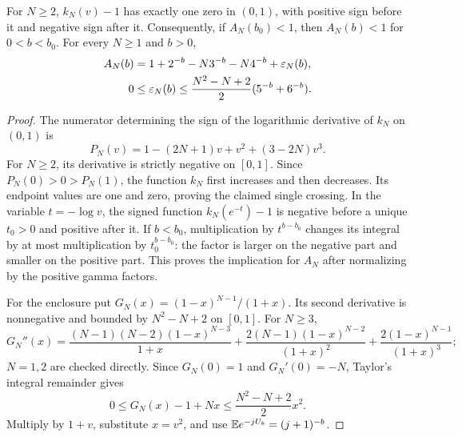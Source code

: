 \begin{lemma}\label{ord:lem:axis}
For $N\ge2$, $k_N(v)-1$ has exactly one zero in $(0,1)$, with positive
sign before it and negative sign after it. Consequently, if
$A_N(b_0)<1$, then $A_N(b)<1$ for $0<b<b_0$.
For every $N\ge1$ and $b>0$,
\begin{equation}\label{ord:eq:axis-taylor}
 \begin{split}
 A_N(b)&=1+2^{-b}-N3^{-b}-N4^{-b}+\varepsilon_N(b),\\
 0&\le\varepsilon_N(b)\le\frac{N^2-N+2}{2}(5^{-b}+6^{-b}).
 \end{split}
\end{equation}
\end{lemma}
\begin{proof}
The numerator determining the sign of the logarithmic derivative of
$k_N$ on $(0,1)$ is
\[
 P_N(v)=1-(2N+1)v+v^2+(3-2N)v^3.
\]
For $N\ge2$, its derivative is strictly negative on $[0,1]$.
Since $P_N(0)>0>P_N(1)$, the function $k_N$ first increases and then
decreases. Its endpoint values are one and zero, proving the claimed
single crossing.
In the variable $t=-\log v$, the signed function $k_N(e^{-t})-1$ is
negative before a unique $t_0>0$ and positive after it. If $b<b_0$,
multiplication by $t^{b-b_0}$ changes its integral by at most multiplication
by $t_0^{b-b_0}$: the factor is larger on the negative part and smaller
on the positive part. This proves the implication for $A_N$ after
normalizing by the positive gamma factors.

For the enclosure put $G_N(x)=(1-x)^{N-1}/(1+x)$. Its second derivative
is nonnegative and bounded by $N^2-N+2$ on $[0,1]$. For $N\ge3$,
\[
 G_N''(x)=
 \frac{(N-1)(N-2)(1-x)^{N-3}}{1+x}
 +\frac{2(N-1)(1-x)^{N-2}}{(1+x)^2}
 +\frac{2(1-x)^{N-1}}{(1+x)^3};
\]
$N=1,2$ are checked directly. Since $G_N(0)=1$ and $G_N'(0)=-N$,
Taylor's integral remainder gives
\[
 0\le G_N(x)-1+Nx\le\frac{N^2-N+2}{2}x^2.
\]
Multiply by $1+v$, substitute $x=v^2$, and use
$\mathbb E e^{-jU_b}=(j+1)^{-b}$.
\end{proof}

